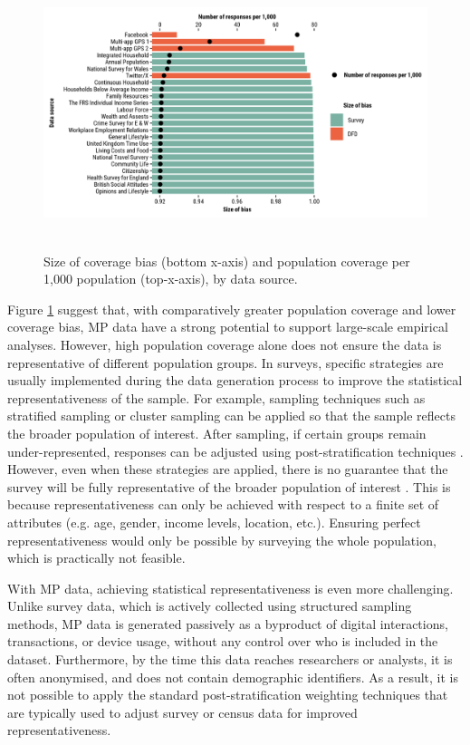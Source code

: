 \documentclass[]{rsos}%
\begin{document}
\begin{figure}
\centering
\includegraphics[width=5.20833in,height=3.125in]{figures/compare-surveys-legend.png}
\caption{Size of coverage bias (bottom x-axis) and population coverage per
1,000 population (top-x-axis), by data
source.}\label{fig:survey}
\end{figure}

Figure \ref{fig:survey} suggest that, with comparatively greater
population coverage and lower coverage bias, MP data have a strong
potential to support large-scale empirical analyses. However, high
population coverage alone does not ensure the data is representative of
different population groups. In surveys, specific strategies are usually
implemented during the data generation process to improve the
statistical representativeness of the sample. For example, sampling
techniques such as stratified sampling or cluster sampling can be
applied so that the sample reflects the broader population of interest.
After sampling, if certain groups remain under-represented, responses
can be adjusted using post-stratification techniques \citep{lohr2021}.
However, even when these strategies are applied, there is no guarantee
that the survey will be fully representative of the broader population
of interest \citep{cochran1977sampling}. This is because representativeness
can only be achieved with respect to a finite set of attributes (e.g.
age, gender, income levels, location, etc.). Ensuring perfect
representativeness would only be possible by surveying the whole
population, which is practically not feasible.

With MP data, achieving statistical representativeness is even more
challenging. Unlike survey data, which is actively collected using
structured sampling methods, MP data is generated passively as a
byproduct of digital interactions, transactions, or device usage,
without any control over who is included in the dataset. Furthermore, by
the time this data reaches researchers or analysts, it is often
anonymised, and does not contain demographic identifiers. As a result,
it is not possible to apply the standard post-stratification weighting
techniques that are typically used to adjust survey or census data for
improved representativeness.
\end{document}
